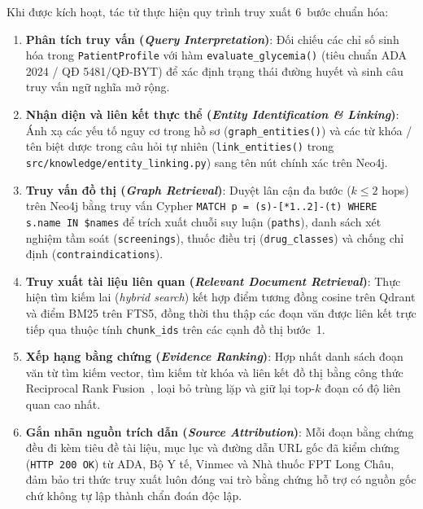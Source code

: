 
Khi được kích hoạt, tác tử  thực hiện quy trình truy xuất 6~bước chuẩn hóa:
\begin{enumerate}
  \item \textbf{Phân tích truy vấn (\emph{Query Interpretation})}: Đối chiếu các chỉ số sinh hóa trong \texttt{PatientProfile} với hàm \texttt{evaluate\_glycemia()} (tiêu chuẩn ADA 2024 / QĐ 5481/QĐ-BYT) để xác định trạng thái đường huyết và sinh câu truy vấn ngữ nghĩa mở rộng.
  \item \textbf{Nhận diện và liên kết thực thể (\emph{Entity Identification \& Linking})}: Ánh xạ các yếu tố nguy cơ trong hồ sơ (\texttt{graph\_entities()}) và các từ khóa / tên biệt dược trong câu hỏi tự nhiên (\texttt{link\_entities()} trong \texttt{src/knowledge/entity\_linking.py}) sang tên nút chính xác trên Neo4j.
  \item \textbf{Truy vấn đồ thị (\emph{Graph Retrieval})}: Duyệt lân cận đa bước ($k \le 2$ hops) trên Neo4j bằng truy vấn Cypher \texttt{MATCH p = (s)-[*1..2]-(t) WHERE s.name IN \$names} để trích xuất chuỗi suy luận (\texttt{paths}), danh sách xét nghiệm tầm soát (\texttt{screenings}), thuốc điều trị (\texttt{drug\_classes}) và chống chỉ định (\texttt{contraindications}).
  \item \textbf{Truy xuất tài liệu liên quan (\emph{Relevant Document Retrieval})}: Thực hiện tìm kiếm lai (\emph{hybrid search}) kết hợp điểm tương đồng cosine trên Qdrant và điểm BM25 trên FTS5, đồng thời thu thập các đoạn văn được liên kết trực tiếp qua thuộc tính \texttt{chunk\_ids} trên các cạnh đồ thị bước~1.
  \item \textbf{Xếp hạng bằng chứng (\emph{Evidence Ranking})}: Hợp nhất danh sách đoạn văn từ tìm kiếm vector, tìm kiếm từ khóa và liên kết đồ thị bằng công thức Reciprocal Rank Fusion~, loại bỏ trùng lặp và giữ lại top-$k$ đoạn có độ liên quan cao nhất.
  \item \textbf{Gắn nhãn nguồn trích dẫn (\emph{Source Attribution})}: Mỗi đoạn bằng chứng đều đi kèm tiêu đề tài liệu, mục lục và đường dẫn URL gốc đã kiểm chứng (\texttt{HTTP 200 OK}) từ ADA, Bộ Y tế, Vinmec và Nhà thuốc FPT Long Châu, đảm bảo tri thức truy xuất luôn đóng vai trò bằng chứng hỗ trợ có nguồn gốc chứ không tự lập thành chẩn đoán độc lập.
\end{enumerate}
